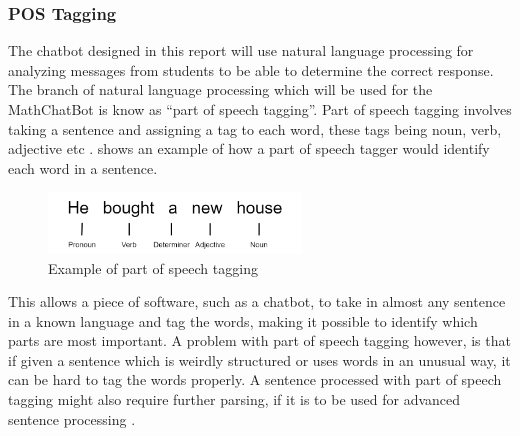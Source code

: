 \subsubsection{POS Tagging}
The chatbot designed in this report will use natural language processing for analyzing messages from students to be able to determine the correct response. The branch of natural language processing which will be used for the MathChatBot is know as \enquote{part of speech tagging}. Part of speech tagging involves taking a sentence and assigning a tag to each word, these tags being noun, verb, adjective etc \cite{NelsonNaturalTechnologies}.  shows an example of how a part of speech tagger would identify each word in a sentence.

\begin{figure}[H]
    \centering
    \includegraphics[width=0.6\textwidth]{figures/NLP_example.png}
    \caption{Example of part of speech tagging}
    \label{fig:NLP_example}
\end{figure}

\noindent
This allows a piece of software, such as a chatbot, to take in almost any sentence in a known language and tag the words, making it possible to identify which parts are most important. A problem with part of speech tagging however, is that if given a sentence which is weirdly structured or uses words in an unusual way, it can be hard to tag the words properly. A sentence processed with part of speech tagging might also require further parsing, if it is to be used for advanced sentence processing \cite{NelsonNaturalTechnologies}. 
